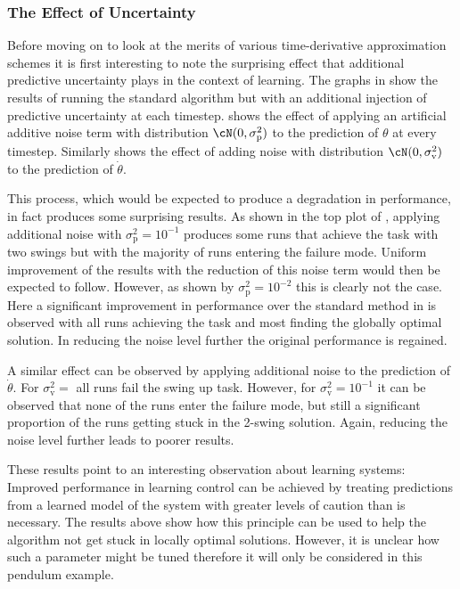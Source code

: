 \subsubsection{The Effect of Uncertainty}
Before moving on to look at the merits of various time-derivative approximation schemes it is first interesting to note the surprising effect that additional predictive uncertainty plays in the context of learning. The graphs in  show the results of running the standard algorithm but with an additional injection of predictive uncertainty at each timestep.  shows the effect of applying an artificial additive noise term with distribution $\cN(0,\sigma_{\text{p}}^2)$ to the prediction of $\theta$ at every timestep. Similarly  shows the effect of adding noise with distribution $\cN(0,\sigma_{\text{v}}^2)$ to the prediction of $\dot\theta$.

This process, which would be expected to produce a degradation in performance, in fact produces some surprising results. As shown in the top plot of , applying additional noise with $\sigma_{\text{p}}^2 = 10^{-1}$ produces some runs that achieve the task with two swings but with the majority of runs entering the failure mode. Uniform improvement of the results with the reduction of this noise term would then be expected to follow. However, as shown by $\sigma_{\text{p}}^2 = 10^{-2}$ this is clearly not the case. Here a significant improvement in performance over the standard method in  is observed with all runs achieving the task and most finding the globally optimal solution. In reducing the noise level further the original performance is regained. 

A similar effect can be observed by applying additional noise to the prediction of $\dot\theta$. For $\sigma_{\text{v}}^2 = $ all runs fail the swing up task. However, for $\sigma_{\text{v}}^2 = 10^{-1}$ it can be observed that none of the runs enter the failure mode, but still a significant proportion of the runs getting stuck in the 2-swing solution. Again, reducing the noise level further leads to poorer results.


These results point to an interesting observation about learning systems: Improved performance in learning control can be achieved by treating predictions from a learned model of the system with greater levels of caution than is necessary. The results above show how this principle can be used to help the algorithm not get stuck in locally optimal solutions. However, it is unclear how such a parameter might be tuned therefore it will only be considered in this pendulum example.



